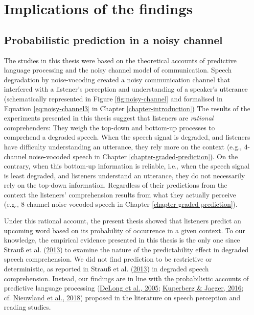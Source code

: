 \documentclass[a4paper, nobind]{templates/ociamthesis}
\begin{document}
\hypertarget{implications-of-the-findings}{%
\section{Implications of the findings}\label{implications-of-the-findings}}

\hypertarget{probabilistic-prediction-in-a-noisy-channel}{%
\subsection{Probabilistic prediction in a noisy channel}\label{probabilistic-prediction-in-a-noisy-channel}}

The studies in this thesis were based on the theoretical accounts of predictive language processing and the noisy channel model of communication.
Speech degradation by noise-vocoding created a noisy communication channel that interfered with a listener's perception and understanding of a speaker's utterance
(schematically represented in Figure \ref{fig:noisy-channel} and
formalised in Equation \eqref{eq:noisy-channel3} in Chapter \ref{chapter-introduction})
The results of the experiments presented in this thesis suggest that listeners are \emph{rational} comprehenders:
They weigh the top-down and bottom-up processes to comprehend a degraded speech.
When the speech signal is degraded, and listeners have difficulty understanding an utterance,
they rely more on the context (e.g., 4-channel noise-vocoded speech in Chapter \ref{chapter-graded-prediction}).
On the contrary, when this bottom-up information is reliable, i.e.,
when the speech signal is least degraded, and listeners understand an utterance,
they do not necessarily rely on the top-down information.
Regardless of their predictions from the context
the listeners' comprehension results from what they actually perceive (e.g., 8-channel noise-vocoded speech in Chapter \ref{chapter-graded-prediction}).

Under this rational account, the present thesis showed that listeners predict an upcoming word based on its probability of occurrence in a given context.
To our knowledge, the empirical evidence presented in this thesis is the only one since Strauß et al. (\protect\hyperlink{ref-Strauss2013}{2013}) to examine the nature of the predictability effect in degraded speech comprehension.
We did not find prediction to be restrictive or deterministic, as reported in Strauß et al. (\protect\hyperlink{ref-Strauss2013}{2013}) in degraded speech comprehension.
Instead, our findings are in line with the probabilistic accounts of predictive language processing (\protect\hyperlink{ref-Delong2005}{DeLong et al., 2005}; \protect\hyperlink{ref-Kuperberg2016}{Kuperberg \& Jaeger, 2016}; cf. \protect\hyperlink{ref-Nieuwland2018}{Nieuwland et al., 2018}) proposed in the literature on speech perception and reading studies.
\end{document}

